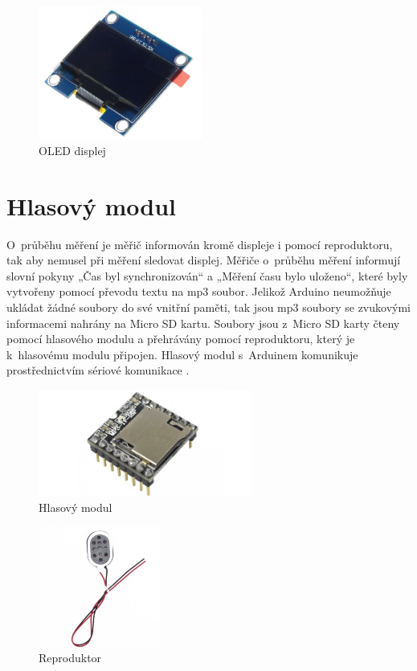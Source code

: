 \begin{figure}[H]
	\centering
	\includegraphics[width=5.4cm]{images/komponenty/displej.jpg}
	\caption{OLED displej \cite{dratek_web}}
\end{figure}

\section{Hlasový modul}
O~průběhu měření je měřič informován kromě displeje i pomocí reproduktoru, tak aby nemusel při měření sledovat displej. Měřiče o~průběhu měření informují slovní pokyny „Čas byl synchronizován“ a „Měření času bylo uloženo“, které byly vytvořeny pomocí převodu textu na mp3 soubor. Jelikož Arduino neumožňuje ukládat žádné soubory do své vnitřní paměti, tak jsou mp3 soubory se zvukovými informacemi nahrány na Micro SD kartu. Soubory jsou z~Micro SD karty čteny pomocí hlasového modulu a přehrávány pomocí reproduktoru, který je k~hlasovému modulu připojen. Hlasový modul s~Arduinem komunikuje prostřednictvím sériové komunikace \cite{arduino_navody}.

\begin{figure}[H]
	\centering
	\includegraphics[width=7cm]{images/komponenty/DF_Player.jpg}
	\caption{Hlasový modul \cite{laskakit_web}}
\end{figure}

\begin{figure}[H]
	\centering
	\includegraphics[width=4cm]{images/komponenty/reproduktor.jpg}
	\caption{Reproduktor \cite{arduino}}
\end{figure}

